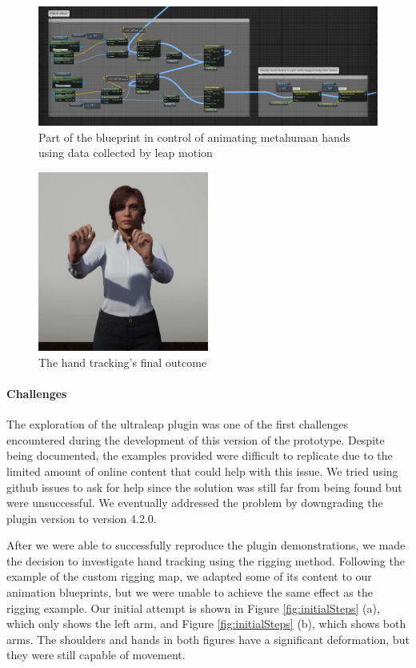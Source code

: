 \begin{figure}[!htb]
\includegraphics[width=\textwidth]{figures/BPHandsAndIK.png}
\centering
\caption{Part of the blueprint in control of animating metahuman hands using data collected by leap motion}
\label{fig:BPHandsAndIK}
\end{figure}

\begin{figure}[!htb]
\includegraphics[width=0.5\textwidth]{figures/final.png}
\centering
\caption{The hand tracking's final outcome}
\label{fig:handTrack}
\end{figure}

\paragraph{Challenges}
The exploration of the ultraleap plugin was one of the first challenges encountered during the development of this version of the prototype. Despite being documented, the examples provided were difficult to replicate due to the limited amount of online content that could help with this issue. We tried using github issues to ask for help since the solution was still far from being found but were unsuccessful. We eventually addressed the problem by downgrading the plugin version to version 4.2.0. 

After we were able to successfully reproduce the plugin demonstrations, we made the decision to investigate hand tracking using the rigging method. Following the example of the custom rigging map, we adapted some of its content to our animation blueprints, but we were unable to achieve the same effect as the rigging example. Our initial attempt is shown in Figure \ref{fig:initialSteps} (a), which only shows the left arm, and Figure \ref{fig:initialSteps} (b), which shows both arms. The shoulders and hands in both figures have a significant deformation, but they were still capable of movement.

